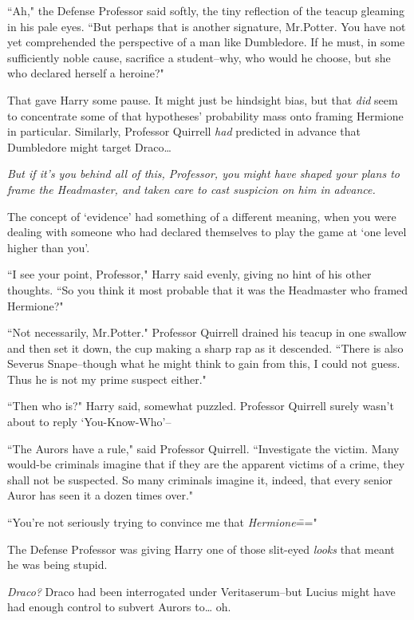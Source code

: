 ``Ah," the Defense Professor said softly, the tiny reflection of the teacup gleaming in his pale eyes. ``But perhaps that is another signature, Mr.\?Potter. You have not yet comprehended the perspective of a man like Dumbledore. If he must, in some sufficiently noble cause, sacrifice a student\---why, who would he choose, but she who declared herself a heroine?"

That gave Harry some pause. It might just be hindsight bias, but that \emph{did} seem to concentrate some of that hypotheses' probability mass onto framing Hermione in particular. Similarly, Professor Quirrell \emph{had} predicted in advance that Dumbledore might target Draco{\ldots}

\emph{But if it's you behind all of this, Professor, you might have shaped your plans to frame the Headmaster, and taken care to cast suspicion on him in advance.}

The concept of `evidence' had something of a different meaning, when you were dealing with someone who had declared themselves to play the game at `one level higher than you'.

``I see your point, Professor," Harry said evenly, giving no hint of his other thoughts. ``So you think it most probable that it was the Headmaster who framed Hermione?"

``Not necessarily, Mr.\?Potter." Professor Quirrell drained his teacup in one swallow and then set it down, the cup making a sharp rap as it descended. ``There is also Severus Snape\---though what he might think to gain from this, I could not guess. Thus he is not my prime suspect either."

``Then who is?" Harry said, somewhat puzzled. Professor Quirrell surely wasn't about to reply `You-Know-Who'\---

``The Aurors have a rule," said Professor Quirrell. ``Investigate the victim. Many would-be criminals imagine that if they are the apparent victims of a crime, they shall not be suspected. So many criminals imagine it, indeed, that every senior Auror has seen it a dozen times over."

``You're not seriously trying to convince me that \emph{Hermione}\==="

The Defense Professor was giving Harry one of those slit-eyed \emph{looks} that meant he was being stupid.

\emph{Draco?} Draco had been interrogated under Veritaserum\---but Lucius might have had enough control to subvert Aurors to{\ldots} oh.

